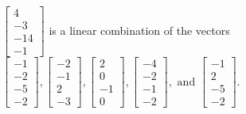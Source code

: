 \begin{exercise}
\begin{exerciseStatement}
  \end{exerciseStatement}
  \begin{exerciseAnswer}
   \(\left[\begin{array}{c}
4 \\
-3 \\
-14 \\
-1
\end{array}\right]\) 
  	 is  
	a linear combination of the vectors \(\left[\begin{array}{c}
-1 \\
-2 \\
-5 \\
-2
\end{array}\right] , \left[\begin{array}{c}
-2 \\
-1 \\
2 \\
-3
\end{array}\right] , \left[\begin{array}{c}
2 \\
0 \\
-1 \\
0
\end{array}\right] , \left[\begin{array}{c}
-4 \\
-2 \\
-1 \\
-2
\end{array}\right] , \text{ and } \left[\begin{array}{c}
-1 \\
2 \\
-5 \\
-2
\end{array}\right]\).

	
  


  \end{exerciseAnswer}
\end{exercise}